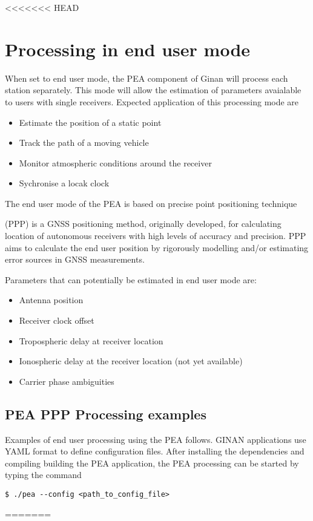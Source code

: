 <<<<<<< HEAD
\chapter{Processing in end user mode}
When set to end user mode, the PEA component of Ginan will process each station separately. This mode will allow the estimation of parameters avaialable to users with single receivers. Expected application of this processing mode are
\begin{itemize}
	\item Estimate the position of a static point
	\item Track the path of a moving vehicle
	\item Monitor atmospheric conditions around the receiver
	\item Sychronise a locak clock
\end{itemize}
The end user  mode of the PEA is based on precise point positioning technique

(PPP) is a GNSS positioning method, originally developed, for calculating location of autonomous receivers with high levels of accuracy and precision. PPP aims to calculate the end user position by rigorously modelling and/or estimating error sources in GNSS measurements. 


Parameters that can potentially be estimated in end user mode are:
\begin{itemize}
	\item Antenna position
	\item Receiver clock offset
	\item Tropospheric delay at receiver location
	\item Ionospheric delay at the receiver location (not yet available)
	\item Carrier phase ambiguities
\end{itemize}

\section{PEA PPP Processing examples}
Examples of end user processing using the PEA follows. GINAN applications use YAML format to define configuration files. After installing the dependencies and compiling building the PEA application, the PEA processing can be started by typing the command 
\begin{verbatim}
$ ./pea --config <path_to_config_file>
\end{verbatim}
=======
